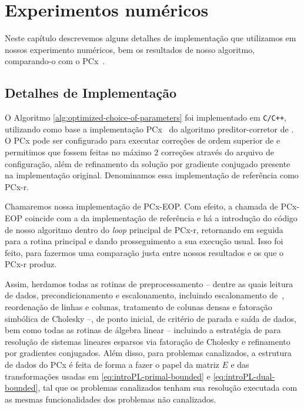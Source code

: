 

\chapter{Experimentos numéricos}
\label{chap:numerical}



Neste capítulo descrevemos alguns detalhes de implementação que utilizamos em nossos experimento numéricos, bem os resultados de nosso algoritmo, comparando-o com o  PCx~\cite{Czyzyk:1999hk}.



\section{Detalhes de Implementação}

O Algoritmo \ref{alg:optimized-choice-of-parameters} foi implementado em  \texttt{C/C++}, utilizando como base a implementação PCx~\cite{Czyzyk:1999hk} do algoritmo preditor-corretor de \textcite{Mehrotra:1992wr}. O PCx pode ser configurado para executar correções de ordem superior de \textcite{Gondzio:1996uw} e permitimos que fossem feitas no máximo 2 correções através do arquivo de configuração, além de  refinamento da solução por gradiente conjugado presente na implementação original. Denominamos essa implementação de referência como PCx-r.

  Chamaremos nossa implementação de PCx-EOP. Com efeito, a chamada de PCx-EOP coincide com a da implementação de referência e há a introdução do código de nosso algoritmo dentro do \emph{loop} principal de PCx-r,  retornando em seguida para a rotina principal e dando prosseguimento a sua execução usual. Isso foi feito, para fazermos uma comparação justa entre nossos resultados e os que o PCx-r produz. 

  Assim, herdamos todas as rotinas de preprocessamento -- dentre as quais leitura de dados, precondicionamento e escalonamento, incluindo escalonamento de~\textcite{Curtis:1972cp}, reordenação de linhas e colunas, tratamento de colunas densas e fatoração simbólica de Cholesky --, de ponto inicial, de critério de parada e saída de dados,   bem como todas as rotinas de álgebra linear -- incluindo a estratégia  de \textcite{Ng:1993uz} para resolução de sistemas lineares esparsos via fatoração de Cholesky  e refinamento por gradientes conjugados. Além disso, para problemas canalizados, a estrutura de dados do PCx é feita de forma a fazer o papel da matriz $E$ e das transformações usadas em \eqref{eq:introPL-primal-bounded} e \eqref{eq:introPL-dual-bounded}, tal que os problemas canalizados tenham sua resolução executada com  as mesmas funcionalidades dos problemas não canalizados. 



